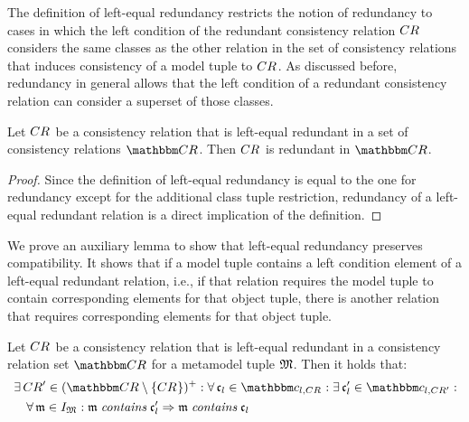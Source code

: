 The definition of left-equal redundancy restricts the notion of redundancy to cases in which the left condition of the redundant consistency relation $\consistencyrelation{CR}{}$ considers the same classes as the other relation in the set of consistency relations that induces consistency of a model tuple to $\consistencyrelation{CR}{}$.
As discussed before, redundancy in general allows that the left condition of a redundant consistency relation can consider a superset of those classes.

\begin{lemma} \label{lemma:leftequalredundancyimpliesredundancy}
    Let $\consistencyrelation{CR}{}$ be a consistency relation that is left-equal redundant in a set of consistency relations $\consistencyrelationset{CR}$. Then $\consistencyrelation{CR}{}$ is redundant in $\consistencyrelationset{CR}$.
\end{lemma}
\begin{proof}
    Since the definition of left-equal redundancy is equal to the one for redundancy except for the additional class tuple restriction, redundancy of a left-equal redundant relation is a direct implication of the definition.
\end{proof}

We prove an auxiliary lemma to show that left-equal redundancy preserves compatibility.
It shows that if a model tuple contains a left condition element of a left-equal redundant relation, i.e., if that relation requires the model tuple to contain corresponding elements for that object tuple, there is another relation that requires corresponding elements for that object tuple.

\begin{lemma} \label{lemma:leftequalredundancysubset}
    Let $\consistencyrelation{CR}{}$ be a consistency relation that is left-equal redundant in a consistency relation set $\consistencyrelationset{CR}$ for a metamodel tuple $\metamodeltuple{M}$. Then it holds that: 
    \begin{align*}
        &
        \exists \consistencyrelation{CR}{}' \in \transitiveclosure{(\consistencyrelationset{CR} \setminus \setted{\consistencyrelation{CR}{}})} : 
        \forall \conditionelement{c}{l} \in \condition{c}{l, \consistencyrelation{CR}{}} : 
        \exists \conditionelement{c}{l}' \in \condition{c}{l,\consistencyrelation{CR}{}'} : \\
        & \formulaskip
        \forall \modeltuple{m} \in \metamodeltupleinstanceset{M} : 
        \modeltuple{m} \containsmath \conditionelement{c}{l}' \Rightarrow 
        \modeltuple{m} \containsmath \conditionelement{c}{l}
    \end{align*}
\end{lemma}

